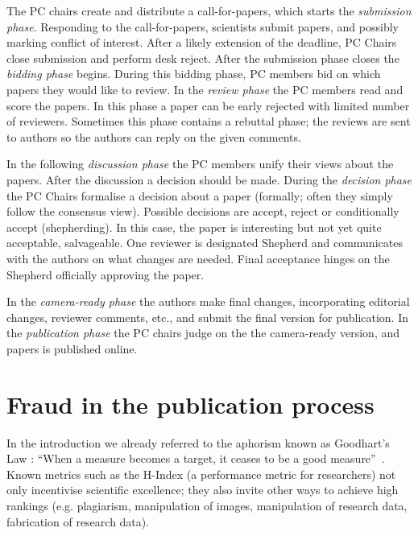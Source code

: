 \documentclass{ou-report}
\begin{document}
The PC chairs create and distribute a call-for-papers, which starts the 
\emph{submission phase}.
Responding to the call-for-papers, scientists submit papers, and possibly 
marking conflict of interest. 
After a likely extension of the deadline, PC Chairs close submission and 
perform desk reject.
After the submission phase closes the \emph{bidding phase} begins. During 
this bidding phase, PC members bid on which papers they would like to review.
In the \emph{review phase} the PC members read and score the papers. In this 
phase a paper can be early rejected with limited number of reviewers. Sometimes 
this phase contains a rebuttal phase; the reviews are sent to authors so the 
authors can reply on the given comments.

In the following \emph{discussion phase} the PC members unify their views about
the papers. After the discussion a decision should be made.
During the \emph{decision phase} the PC Chairs formalise a decision about a 
paper (formally; often they simply follow the consensus view). Possible 
decisions are accept, reject or conditionally accept (shepherding). In this 
case, the paper is interesting but not yet quite acceptable, salvageable. One 
reviewer is designated Shepherd and communicates with the authors on what 
changes are needed. Final acceptance hinges on the Shepherd officially 
approving the paper.

In the \emph{camera-ready phase} the authors make final changes, 
incorporating editorial changes, reviewer comments, etc., and submit the final 
version for publication.
In the \emph{publication phase} the PC chairs judge on the the camera-ready 
version, and papers is published online.


\section{Fraud in the publication process}
\label{sec:domain_analysis:fraud}
In the introduction we already referred to the aphorism known as Goodhart’s Law 
: ``When a measure becomes a 
target, it ceases to be a good measure''~\cite{strathern_1997}. Known metrics 
such as the H-Index (a performance metric for researchers) not only incentivise 
scientific excellence; they also invite other ways to achieve high rankings 
(e.g. plagiarism, manipulation of images, manipulation of research data, 
fabrication of research data). 
\end{document}
